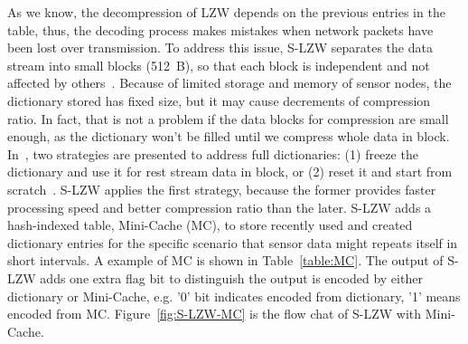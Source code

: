 As we know, the decompression of LZW depends on the previous entries in the
table, thus, the decoding process makes mistakes when network packets have been
lost over transmission. To address this issue, S-LZW separates the data stream
into small blocks (512~B), so that each block is independent and not affected by
others~\cite{sadler2006data}. Because of limited storage and memory of sensor
nodes, the dictionary stored has fixed size, but it may cause decrements of
compression ratio. In fact, that is not a problem if the data blocks for
compression are small enough, as the dictionary won't be filled until we
compress whole data in block. In~\cite{sadler2006data}, two strategies are
presented to address full dictionaries: (1) freeze the dictionary and use it for
rest stream data in block, or (2) reset it and start from
scratch~\cite{sadler2006data}. S-LZW applies the first strategy, because the
former provides faster processing speed and better compression ratio than the
later. S-LZW adds a hash-indexed table, Mini-Cache (MC), to store recently used
and created dictionary entries for the specific scenario that sensor data might
repeats itself in short intervals. A example of MC is shown in
Table~\ref{table:MC}. The output of S-LZW adds one extra flag bit to distinguish
the output is encoded by either dictionary or Mini-Cache, e.g. '0' bit indicates
encoded from dictionary, '1' means encoded from MC. Figure~\ref{fig:S-LZW-MC} is
the flow chat of S-LZW with Mini-Cache.
